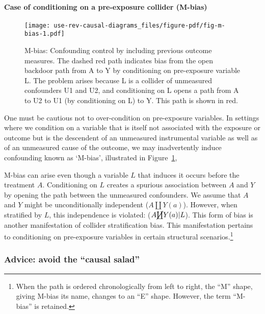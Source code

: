 \documentclass[
  singlecolumn,
  9pt]{article}
\let\oldparagraph\paragraph
\renewcommand{\paragraph}[1]{\oldparagraph{#1}\mbox{}}
\begin{document}
\paragraph{Case of conditioning on a pre-exposure collider
(M-bias)}\label{case-of-conditioning-on-a-pre-exposure-collider-m-bias}

\begin{figure}

{\centering \texttt{[image: use-rev-causal-diagrams\_files/figure-pdf/fig-m-bias-1.pdf]}

}

\caption{\label{fig-m-bias}M-bias: Confounding control by including
previous outcome measures. The dashed red path indicates bias from the
open backdoor path from A to Y by conditioning on pre-exposure variable
L. The problem arises because L is a collider of unmeasured confounders
U1 and U2, and conditioning on L opens a path from A to U2 to U1 (by
conditioning on L) to Y. This path is shown in red.}

\end{figure}

One must be cautious not to over-condition on pre-exposure variables. In
settings where we condition on a variable that is itself not associated
with the exposure or outcome but is the descendent of an unmeasured
instrumental variable as well as of an unmeasured cause of the outcome,
we may inadvertently induce confounding known as `M-bias', illustrated
in Figure~\ref{fig-m-bias},

M-bias can arise even though a variable \(L\) that induces it occurs
before the treatment \(A\). Conditioning on \(L\) creates a spurious
association between \(A\) and \(Y\) by opening the path between the
unmeasured confounders. We assume that \(A\) and \(Y\) might be
unconditionally independent (\(A \coprod Y(a)\)). However, when
stratified by \(L\), this independence is violated:
(\(A \cancel{\coprod} Y(a)| L\)). This form of bias is another
manifestation of collider stratification bias. This manifestation
pertains to conditioning on pre-exposure variables in certain structural
scenarios.\footnote{When the path is ordered chronologically from left
  to right, the ``M'' shape, giving M-bias its name, changes to an ``E''
  shape. However, the term ``M-bias'' is retained.}

\subsubsection{Advice: avoid the ``causal
salad''}\label{advice-avoid-the-causal-salad}
\end{document}

